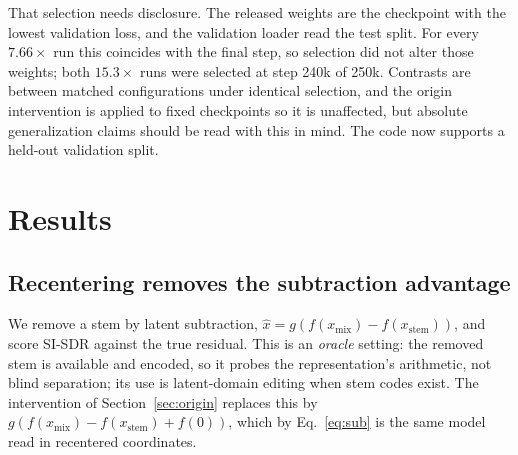 \documentclass[conference]{IEEEtran}
\newcommand{\secref}[1]{Section~\ref{#1}}
\begin{document}
That selection needs disclosure. The released weights are the checkpoint with
the lowest validation loss, and the validation loader read the test split. For
every $7.66\times$ run this coincides with the final step, so selection did
not alter those weights; both $15.3\times$ runs were selected at step 240k of
250k. Contrasts are between matched configurations under identical selection,
and the origin intervention is applied to fixed checkpoints so it is unaffected,
but absolute generalization claims should be read with this in mind. The code
now supports a held-out validation split.

\section{Results}\label{sec:results}

\subsection{Recentering removes the subtraction advantage}\label{sec:subtraction}
We remove a stem by latent subtraction,
$\hat{x}=g(f(x_\mathrm{mix}){-}f(x_\mathrm{stem}))$, and score SI-SDR against
the true residual. This is an \emph{oracle} setting: the removed stem is
available and encoded, so it probes the representation's arithmetic, not blind
separation; its use is latent-domain editing when stem codes exist. The
intervention of
\secref{sec:origin} replaces this by
$g(f(x_\mathrm{mix}){-}f(x_\mathrm{stem}){+}f(0))$, which by
Eq.~\ref{eq:sub} is the same model read in recentered coordinates.

\begin{table}[t]
  \centering\small
  \setlength{\tabcolsep}{2.2pt}
  
  \caption{Stem removal by latent subtraction (SI-SDR, dB; MUSDB18 test,
  5{,}880 units from 49 tracks). ``$+f(0)$'' rows read the \emph{same}
  checkpoint in recentered coordinates. ``gap'' is the linearity tax against
  each model's own encode--decode reconstruction of the residual (lower is
  better).}
  \label{tab:subtraction}
\end{table}

\begin{table}[t]
  \centering\small
  \setlength{\tabcolsep}{3.0pt}
  
  \caption{The intervention on fixed checkpoints. Advantage in stem-subtraction SI-SDR (dB) of each mixing-trained model over the matched control at the same compression rate trained without
  mixing supervision, before and after recentering,
with the paired change and the number of tracks on which the advantage
shrinks. Recentering is a change of coordinates only: no retraining, same
units, same audio.}
  \label{tab:origin}
\end{table}
\end{document}
